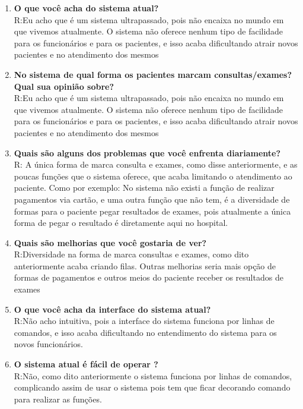 \begin{enumerate}
  \item \textbf{O que você acha do sistema atual?}
  \\R:Eu acho que é um sistema ultrapassado, pois não encaixa no mundo em que vivemos atualmente. O sistema não oferece nenhum tipo de facilidade para os funcionários e para os pacientes, e isso acaba dificultando atrair novos pacientes e no atendimento dos mesmos \\

  \item \textbf{No sistema de qual forma os pacientes marcam consultas/exames? Qual sua opinião sobre?}
  \\R:Eu acho que é um sistema ultrapassado, pois não encaixa no mundo em que vivemos atualmente. O sistema não oferece nenhum tipo de facilidade para os funcionários e para os pacientes, e isso acaba dificultando atrair novos pacientes e no atendimento dos mesmos \\

  \item \textbf{Quais são alguns dos problemas que você enfrenta diariamente?}
  \\R: A única forma de marca consulta e exames, como disse anteriormente, e as poucas funções que o sistema oferece, que acaba limitando o atendimento ao paciente. Como por exemplo: No sistema não existi a função de realizar pagamentos via cartão, e uma outra função que não tem, é a diversidade de formas para o paciente pegar resultados de exames, pois atualmente a única forma de pegar o resultado é diretamente aqui no hospital. \\

  \item \textbf{Quais são melhorias que você gostaria de ver?}
  \\R:Diversidade na forma de marca consultas e exames, como dito anteriormente acaba criando filas. Outras melhorias seria mais opção de formas de pagamentos e outros meios do paciente receber os resultados de exames \\

  \item \textbf{O que você acha da interface do sistema atual?}
  \\R:Não acho intuitiva, pois a interface do sistema funciona por linhas de comandos, e isso acaba dificultando no entendimento do sistema para os novos funcionários. \\

  \item \textbf{O sistema atual é fácil de operar ?}
  \\R:Não, como dito anteriormente o sistema funciona por linhas de comandos, complicando assim de usar o sistema pois tem que ficar decorando comando para realizar as funções. \\


\end{enumerate}
